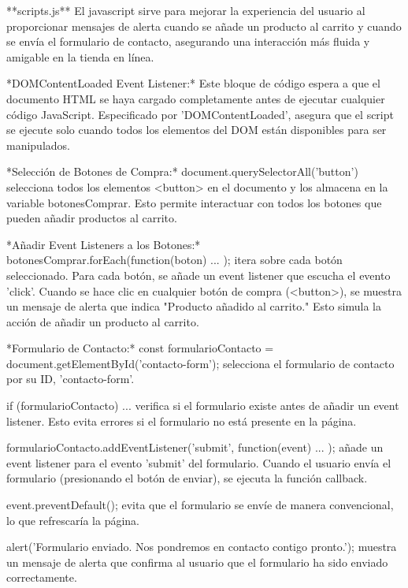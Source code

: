 **scripts.js**
El javascript sirve para mejorar la experiencia del usuario al proporcionar mensajes
de alerta cuando se añade un producto al carrito y cuando se envía el formulario de 
contacto, asegurando una interacción más fluida y amigable en la tienda en línea.

*DOMContentLoaded Event Listener:*
Este bloque de código espera a que el documento HTML se haya cargado completamente 
antes de ejecutar cualquier código JavaScript. Especificado por 'DOMContentLoaded',
asegura que el script se ejecute solo cuando todos los elementos del DOM están 
disponibles para ser manipulados.


*Selección de Botones de Compra:*
document.querySelectorAll('button') selecciona todos los elementos <button> en el 
documento y los almacena en la variable botonesComprar. Esto permite interactuar
con todos los botones que pueden añadir productos al carrito.


*Añadir Event Listeners a los Botones:*
botonesComprar.forEach(function(boton) { ... }); itera sobre cada botón seleccionado. 
Para cada botón, se añade un event listener que escucha el evento 'click'.
Cuando se hace clic en cualquier botón de compra (<button>), se muestra un mensaje de
alerta que indica "Producto añadido al carrito." Esto simula la acción de añadir un
producto al carrito.


*Formulario de Contacto:*
const formularioContacto = document.getElementById('contacto-form'); selecciona el 
formulario de contacto por su ID, 'contacto-form'.

if (formularioContacto) { ... } verifica si el formulario existe antes de añadir un 
event listener. Esto evita errores si el formulario no está presente en la página.

formularioContacto.addEventListener('submit', function(event) { ... }); añade un
event listener para el evento 'submit' del formulario. Cuando el usuario envía
el formulario (presionando el botón de enviar), se ejecuta la función callback.

event.preventDefault(); evita que el formulario se envíe de manera convencional, 
lo que refrescaría la página.

alert('Formulario enviado. Nos pondremos en contacto contigo pronto.'); muestra un mensaje 
de alerta que confirma al usuario que el formulario ha sido enviado correctamente.
